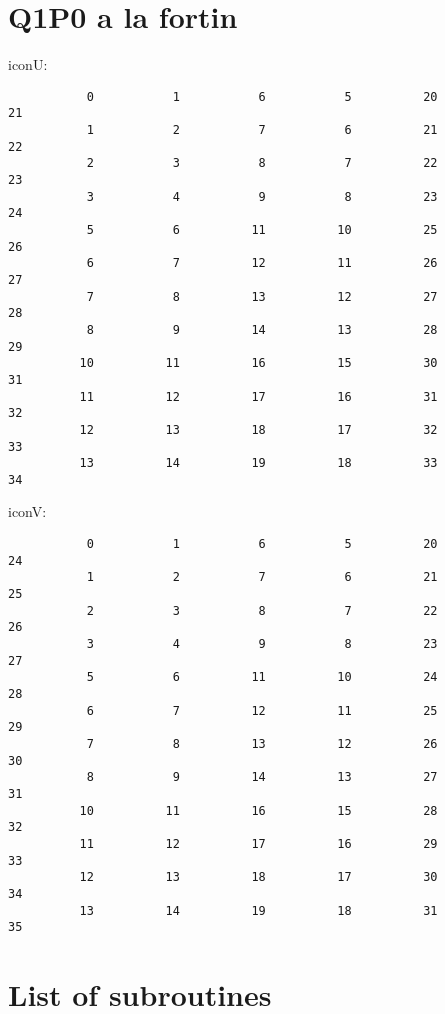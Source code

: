 \documentclass[a4paper,12pt]{article}
\begin{document}
\newpage



\section{Q1P0 a la fortin}



iconU:
\begin{verbatim}
           0           1           6           5          20          21
           1           2           7           6          21          22
           2           3           8           7          22          23
           3           4           9           8          23          24
           5           6          11          10          25          26
           6           7          12          11          26          27
           7           8          13          12          27          28
           8           9          14          13          28          29
          10          11          16          15          30          31
          11          12          17          16          31          32
          12          13          18          17          32          33
          13          14          19          18          33          34
\end{verbatim}




iconV:
\begin{verbatim}
           0           1           6           5          20          24
           1           2           7           6          21          25
           2           3           8           7          22          26
           3           4           9           8          23          27
           5           6          11          10          24          28
           6           7          12          11          25          29
           7           8          13          12          26          30
           8           9          14          13          27          31
          10          11          16          15          28          32
          11          12          17          16          29          33
          12          13          18          17          30          34
          13          14          19          18          31          35
\end{verbatim}






\newpage
\section{List of subroutines}














 \label{chapt:elefant} %

\printbibliography
\end{document}
